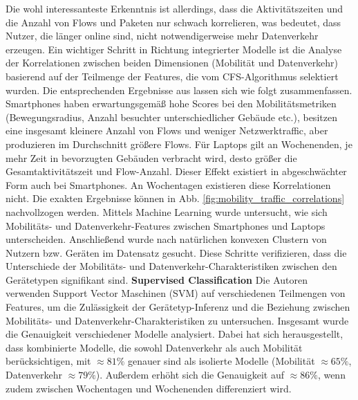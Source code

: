 \documentclass[12pt, a4paper]{article}
\begin{document}
Die wohl interessanteste Erkenntnis ist allerdings, dass die Aktivitätszeiten und die Anzahl von Flows und Paketen nur
schwach korrelieren, was bedeutet, dass Nutzer, die länger online sind, nicht notwendigerweise mehr Datenverkehr erzeugen. \cite{Alipour2018}
\newline\newline
Ein wichtiger Schritt in Richtung integrierter Modelle ist die Analyse der Korrelationen
zwischen beiden Dimensionen (Mobilität und Datenverkehr) basierend auf der Teilmenge der Features,
die vom \textsc{CFS}-Algorithmus selektiert wurden. Die entsprechenden Ergebnisse aus \cite{Alipour2018} lassen sich wie 
folgt zusammenfassen. Smartphones haben erwartungsgemäß hohe Scores bei den Mobilitätsmetriken (Bewegungsradius,
Anzahl besuchter unterschiedlicher Gebäude etc.), besitzen eine
insgesamt kleinere Anzahl von Flows und weniger Netzwerktraffic, aber produzieren im Durchschnitt größere Flows.
Für Laptops gilt an Wochenenden, je mehr Zeit in bevorzugten Gebäuden verbracht wird, desto größer die Gesamtaktivitätszeit
und Flow-Anzahl. Dieser Effekt existiert in abgeschwächter Form auch bei Smartphones. 
An Wochentagen existieren diese Korrelationen nicht. Die exakten Ergebnisse können in Abb. \ref{fig:mobility_traffic_correlations}
nachvollzogen werden. Mittels Machine Learning wurde untersucht, wie sich Mobilitäts- und Datenverkehr-Features zwischen
Smartphones und Laptops unterscheiden. Anschließend wurde nach natürlichen konvexen Clustern von Nutzern bzw. Geräten im
Datensatz gesucht. Diese Schritte verifizieren, dass die Unterschiede der Mobilitäts- und Datenverkehr-Charakteristiken
zwischen den Gerätetypen signifikant sind.
\newline\newline
\textbf{Supervised Classification}\newline
Die Autoren verwenden Support Vector Maschinen (SVM) auf verschiedenen Teilmengen von Features, 
um die Zulässigkeit der Gerätetyp-Inferenz und die Beziehung zwischen Mobilitäts- und Datenverkehr-Charakteristiken
zu untersuchen. Insgesamt wurde die Genauigkeit verschiedener Modelle analysiert. Dabei hat sich herausgestellt,
dass kombinierte Modelle, die sowohl Datenverkehr als auch Mobilität berücksichtigen, mit $\approx 81 \%$ genauer sind als isolierte Modelle
(Mobilität $\approx 65 \%$, Datenverkehr $\approx 79 \%$). Außerdem erhöht sich die Genauigkeit auf $\approx 86 \%$, wenn
zudem zwischen Wochentagen und Wochenenden differenziert wird.
\newline\newline
\end{document}

